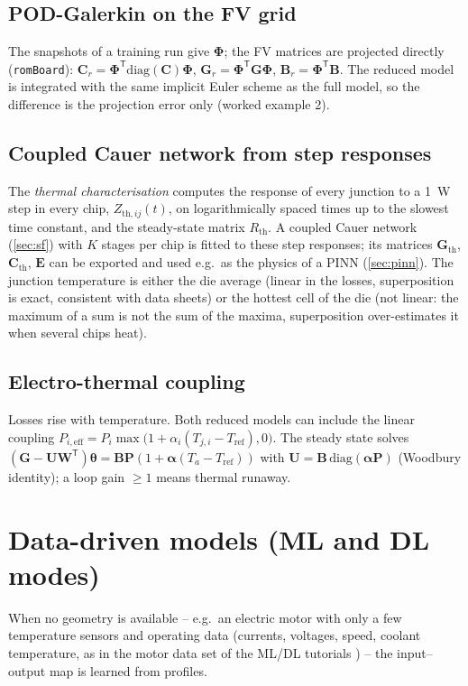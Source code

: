 \documentclass[11pt,a4paper]{article}
\newcommand{\Rth}{R_{\mathrm{th}}}
\newcommand{\Tref}{T_{\mathrm{ref}}}
\newcommand{\T}{^{\mathsf T}}
\newcommand{\mat}[1]{\bm{#1}}
\begin{document}
\subsection{POD-Galerkin on the FV grid}
The snapshots of a training run give $\bm\Phi$; the FV matrices are projected directly (\texttt{romBoard}):
$\mat C_r=\bm\Phi\T\mathrm{diag}(\mat C)\bm\Phi$, $\mat G_r=\bm\Phi\T\mat G\bm\Phi$, $\mat B_r=\bm\Phi\T\mat B$. The
reduced model is integrated with the same implicit Euler scheme as the full model, so the difference is the
projection error only (worked example 2).

\subsection{Coupled Cauer network from step responses}
The \emph{thermal characterisation} computes the response of every junction to a \SI{1}{\watt} step in every chip,
$Z_{\mathrm{th},ij}(t)$, on logarithmically spaced times up to the slowest time constant, and the steady-state matrix
$\Rth$. A coupled Cauer network (\cref{sec:sf}) with $K$ stages per chip is fitted to these step responses; its matrices
$\mat G_{\mathrm{th}}$, $\mat C_{\mathrm{th}}$, $\mat E$ can be exported and used e.g.\ as the physics of a PINN
(\cref{sec:pinn}). The junction temperature is either the die average (linear in the losses, superposition is exact,
consistent with data sheets) or the hottest cell of the die (not linear: the maximum of a sum is not the sum of the
maxima, superposition over-estimates it when several chips heat).

\subsection{Electro-thermal coupling}
Losses rise with temperature. Both reduced models can include the linear coupling
$P_{i,\mathrm{eff}} = P_i\max\bigl(1+\alpha_i(T_{j,i}-\Tref),0\bigr)$. The steady state solves
$(\mat G-\mat U\mat W\T)\bm\theta = \mat B\bm P(1+\bm\alpha(T_a-\Tref))$ with $\mat U=\mat B\,\mathrm{diag}(\bm\alpha\bm P)$
(Woodbury identity); a loop gain $\ge1$ means thermal runaway.

\section{Data-driven models (ML and DL modes)}\label{sec:data}
When no geometry is available -- e.g.\ an electric motor with only a few temperature sensors and operating data
(currents, voltages, speed, coolant temperature, as in the motor data set of the ML/DL tutorials
\cite{kirchgaessner}) -- the input--output map is learned from profiles.
\end{document}
